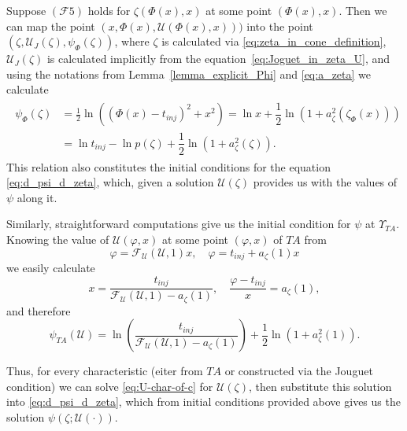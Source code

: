 \documentclass[12pt]{article}
\theoremstyle{definition}
\begin{document}
Suppose $(\mathcal F 5)$ holds for $\zeta(\Phi(x), x)$ at some point $(\Phi(x), x)$. Then we can map the point $(x, \Phi(x), \mathcal{U}(\Phi(x), x)))$ into the point $(\zeta, \mathcal U_J(\zeta), \psi_\Phi(\zeta))$, where $\zeta$ is calculated via \eqref{eq:zeta_in_cone_definition}, $\mathcal U_J(\zeta)$ is calculated implicitly from the equation~\eqref{eq:Joguet_in_zeta_U}, and using the notations from Lemma~\ref{lemma_explicit_Phi} and \eqref{eq:a_zeta} we calculate
\begin{align}
\label{eq:psi_Phi_definition}
\begin{split}
\psi_\Phi(\zeta) &= \frac12\ln((\Phi(x) - t_{inj})^2 + x^2) = \ln x + \dfrac{1}{2}\ln(1+ a^2_\zeta(\zeta_\Phi(x))) \\
{} &= \ln t_{inj} - \ln p(\zeta) + \dfrac{1}{2}\ln(1+ a^2_\zeta(\zeta)).
\end{split}
\end{align}
This relation also constitutes the initial conditions for the equation \eqref{eq:d_psi_d_zeta}, which, given a solution $\mathcal U(\zeta)$ provides us with the values of $\psi$ along it.




Similarly, straightforward computations give us the initial condition for $\psi$ at $\Upsilon_{TA}$. Knowing the value of $\mathcal U(\varphi, x)$ at some point $(\varphi, x)$ of $TA$ from
\[
\varphi = \mathcal F_{\mathcal U}(\mathcal U, 1) x, \quad \varphi = t_{inj} + a_\zeta(1) x
\]
we easily calculate
\[
x = \dfrac{t_{inj}}{\mathcal F_{\mathcal U}(\mathcal U, 1) - a_\zeta(1)}, \quad \dfrac{\varphi - t_{inj}}{x} = a_\zeta(1),
\]
and therefore
\begin{equation}
\label{eq:definition_of_psi_TA}
\psi_{TA}(\mathcal U) = \ln\left(\frac{t_{inj}}{\mathcal F_{\mathcal U}(\mathcal U, 1)  - a_\zeta(1)}\right) + \frac12\ln(1 + a_\zeta^2(1)).
\end{equation}












Thus, for every characteristic (eiter from $TA$ or constructed via the Jouguet condition) we can solve \eqref{eq:U-char-of-c} for $\mathcal U(\zeta)$, then substitute this solution into \eqref{eq:d_psi_d_zeta}, which from initial conditions provided above gives us the solution $\psi(\zeta; \mathcal U(\cdot))$. 
\end{document}
